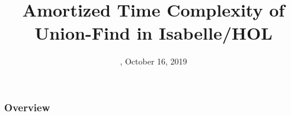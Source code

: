 

                    

\newcommand{\Rplus}{\protect\hspace{-.1em}\protect\raisebox{.35ex}{\smaller{\smaller\textbf{+}}}}
\newcommand{\Cpp}{\mbox{C\Rplus\Rplus}\xspace}
\newcommand{\CppTw}{\mbox{C\Rplus\Rplus 20}\xspace}

\newcommand{\Datum}{\today}

\renewcommand{\PraesentationFusszeileZusatz}{| Amortized Time Complexity of Union-Find in Isabelle/HOL}

\title{Amortized Time Complexity of Union-Find in Isabelle/HOL \newline {}}
\author{\PersonTitel{} \PersonVorname{} \PersonNachname}
\date[\Datum]{\PersonStadt, October 16, 2019}
\subject{Amortized Time Complexity of Union-Find in Isabelle/HOL}


 



\PraesentationMasterStandard

\PraesentationStartseiteUhrenturm
\PraesentationTitelseite %

\begin{frame}
	\frametitle{Overview}
	\vspace{1cm}
	\begin{minipage}[s]{\textwidth}
	\tableofcontents
	\end{minipage}
\end{frame}

